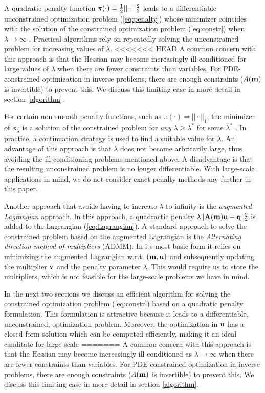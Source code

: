 \documentclass{iopart}
\begin{document}
{A quadratic penalty function $\pi(\cdot) = {\textstyle\frac{1}{2}}||\cdot||_2^2$ leads to a differentiable unconstrained optimization problem (\ref{eq:penalty}) whose minimizer coincides with the solution of the constrained optimization problem (\ref{eq:constr}) when $\lambda \rightarrow \infty$ \cite[Thm. 17.1]{Nocedal}. Practical algorithms rely on repeatedly solving the unconstrained problem for increasing values of $\lambda$.
<<<<<<< HEAD
A common concern with this approach is that the Hessian may become increasingly ill-conditioned for large values of $\lambda$ when there are fewer constraints than variables. For PDE-constrained optimization in inverse problems, there are enough constraints ($A(\mathbf{m})$ is invertible) to prevent this. We discuss this limiting case in more detail in section \ref{algorithm}.

For certain non-smooth penalty functions, such as $\pi(\cdot) = ||\cdot||_1$, the minimizer of $\phi_{\lambda}$ is a solution of the constrained problem for \emph{any} $\lambda \geq \lambda^*$ for some $\lambda^*$ \cite[Thm. 17.3]{Nocedal}. In practice, a continuation strategy is used to find a suitable value for $\lambda$. An advantage of this approach is that $\lambda$ does not become arbritarily large, thus avoiding the ill-conditioning problems mentioned above. A disadvantage is that the resulting unconstrained problem is no longer differentiable. With large-scale applications in mind, we do not consider exact penalty methods any further in this paper.

Another approach that avoids having to increase $\lambda$ to infinity is the \emph{augmented Lagrangian} approach. In this approach, a quadractic penalty $\lambda\|\mathbf{A}(\mathbf{m})\mathbf{u} - \mathbf{q}\|_2^2$ is added to the Lagrangian (\ref{eq:Lagrangian}). A standard approach to solve the constrained problem based on the augmented Lagrangian is the \emph{Alternating direction method of multipliers} (ADMM). In its most basic form it relies on minimizing the augmented Lagrangian w.r.t. $(\mathbf{m}, \mathbf{u})$ and subsequently updating the multiplier $\mathbf{v}$ and the penalty parameter $\lambda$. This would require us to store the multipliers, which is not feasible for the large-scale problems we have in mind.

In the next two sections we discuss an efficient algorithm for solving the constrained optimization problem (\ref{eq:constr}) based on a quadratic penalty formulation. This formulation is attractive because it leads to a differentiable, unconstrained, optimization problem. Moreover, the optimization in $\mathbf{u}$ has a closed-form solution which can be computed efficiently, making it an ideal canditate for large-scale
=======
A common concern with this approach is that the Hessian may become increasingly ill-conditioned as $\lambda\rightarrow\infty$ when there are fewer constraints than variables. For PDE-constrained optimization in inverse problems, there are enough constraints ($A(\mathbf{m})$ is invertible) to prevent this. We discuss this limiting case in more detail in section \ref{algorithm}.

}
\end{document}
